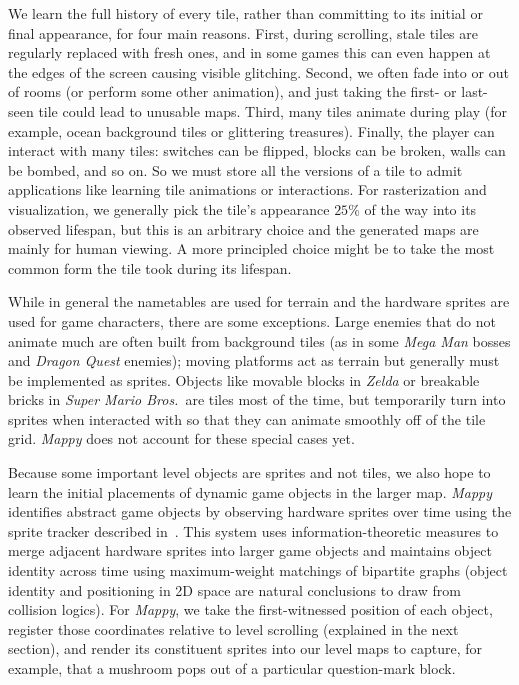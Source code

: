 \documentclass[a4paper]{article}
\begin{document}
We learn the full history of every tile, rather than committing to its initial or final appearance, for four main reasons.
First, during scrolling, stale tiles are regularly replaced with fresh ones, and in some games this can even happen at the edges of the screen causing visible glitching.
Second, we often fade into or out of rooms (or perform some other animation), and just taking the first- or last- seen tile could lead to unusable maps.
Third, many tiles animate during play (for example, ocean background tiles or glittering treasures).
Finally, the player can interact with many tiles: switches can be flipped, blocks can be broken, walls can be bombed, and so on.
So we must store all the versions of a tile to admit applications like learning tile animations or interactions.
For rasterization and visualization, we generally pick the tile's appearance $25\%$ of the way into its observed lifespan, but this is an arbitrary choice and the generated maps are mainly for human viewing.
A more principled choice might be to take the most common form the tile took during its lifespan.

While in general the nametables are used for terrain and the hardware sprites are used for game characters, there are some exceptions.
Large enemies that do not animate much are often built from background tiles (as in some \emph{Mega Man} bosses and \emph{Dragon Quest} enemies); moving platforms act as terrain but generally must be implemented as sprites.
Objects like movable blocks in \emph{Zelda} or breakable bricks in \emph{Super Mario Bros.}\ are tiles most of the time, but temporarily turn into sprites when interacted with so that they can animate smoothly off of the tile grid.
\emph{Mappy} does not account for these special cases yet.

Because some important level objects are sprites and not tiles, we also hope to learn the initial placements of dynamic game objects in the larger map.
\emph{Mappy} identifies abstract game objects by observing hardware sprites over time using the sprite tracker described in~\cite{summerville2017mechanics}.
This system uses information-theoretic measures to merge adjacent hardware sprites into larger game objects and maintains object identity across time using maximum-weight matchings of bipartite graphs (object identity and positioning in 2D space are natural conclusions to draw from collision logics).
For \emph{Mappy}, we take the first-witnessed position of each object, register those coordinates relative to level scrolling (explained in the next section), and render its constituent sprites into our level maps to capture, for example, that a mushroom pops out of a particular question-mark block.
\end{document}
